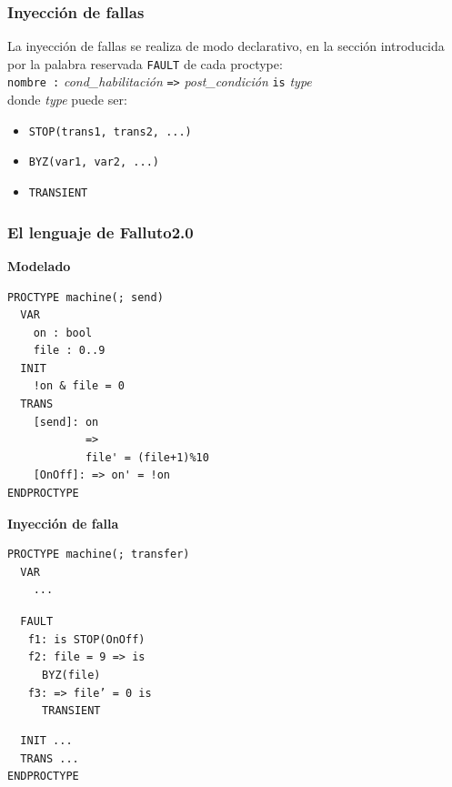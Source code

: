 \documentclass[serif]{beamer}
\begin{document}
\begin{frame}
\frametitle{Inyección de fallas}
La inyección de fallas se realiza de modo declarativo, en la 
sección introducida por la palabra reservada \texttt{FAULT} de 
cada proctype:\\[0.5cm]
\texttt{nombre :} \textit{cond\_habilitaci\'on} \texttt{=>} \textit{post\_condición} \texttt{is} \textit{type} \\[0.5cm]
donde \textit{type} puede ser: \\[0.5cm]
\begin{itemize}\item \texttt{STOP(trans1, trans2, ...)}
\item \texttt{BYZ(var1, var2, ...)}
\item \texttt{TRANSIENT}
\end{itemize}
\end{frame}


\begin{frame}[fragile]
\frametitle{El lenguaje de Falluto2.0}
{\fontsize{7pt}{10pt}\selectfont
\begin{minipage}{0.45\textwidth}
{\large \bfseries Modelado}
\begin{framed} 
\begin{verbatim}
PROCTYPE machine(; send)
  VAR
    on : bool
    file : 0..9
  INIT
    !on & file = 0
  TRANS
    [send]: on 
            => 
            file' = (file+1)%10
    [OnOff]: => on' = !on
ENDPROCTYPE
\end{verbatim}
\end{framed}
\end{minipage}
\hspace{0.04\textwidth}
\begin{minipage}{0.45\textwidth}
{\large \bfseries Inyección de falla}
\begin{framed}
\begin{verbatim}
PROCTYPE machine(; transfer)
  VAR
    ...
\end{verbatim}
\texttt{\color{red}~~FAULT\\$~~~~~$
f1: is STOP(OnOff)\\$~~~~~$
f2: file = 9 => is\\$~~~~~~~~~~$ BYZ(file)\\$~~~~~$
f3: => file' = 0 is\\$~~~~~~~~~~$ TRANSIENT}
\begin{verbatim}
  INIT ...
  TRANS ...
ENDPROCTYPE
\end{verbatim}
\end{framed}
\end{minipage}
} %

\end{frame}
\end{document}
